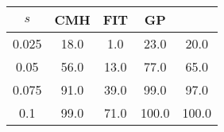 \centering \begin{tabular}{c|c|c|c|c}
$s$	&CMH	&FIT	&GP	&\sc{Clear}\\\hline
0.025	&18.0	&1.0	&23.0	&20.0\\
0.05	&56.0	&13.0	&77.0	&65.0\\
0.075	&91.0	&39.0	&99.0	&97.0\\
0.1	&99.0	&71.0	&100.0	&100.0\\
\end{tabular}

